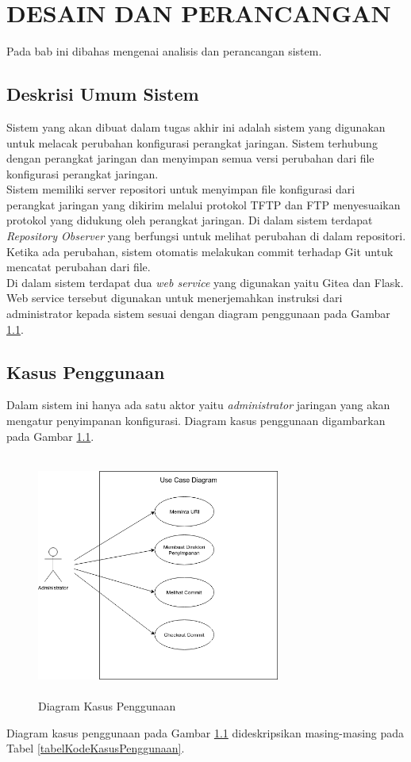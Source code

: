 \chapter{DESAIN DAN PERANCANGAN}
    Pada bab ini dibahas mengenai analisis dan perancangan sistem.
    
    \section{Deskrisi Umum Sistem}
    	Sistem yang akan dibuat dalam tugas akhir ini adalah sistem yang digunakan untuk melacak perubahan konfigurasi perangkat jaringan. Sistem terhubung dengan perangkat jaringan dan menyimpan semua versi perubahan dari file konfigurasi perangkat jaringan.\\
    	
    	\indent Sistem memiliki server repositori untuk menyimpan file konfigurasi dari perangkat jaringan yang dikirim melalui protokol TFTP dan FTP menyesuaikan protokol yang didukung oleh perangkat jaringan. Di dalam sistem terdapat \textit{Repository Observer} yang berfungsi untuk melihat perubahan di dalam repositori. Ketika ada perubahan, sistem otomatis melakukan commit terhadap Git untuk mencatat perubahan dari file.\\
    	
    	\indent Di dalam sistem terdapat dua \textit{web service} yang digunakan yaitu Gitea dan Flask. Web service tersebut digunakan untuk menerjemahkan instruksi dari administrator kepada sistem sesuai dengan diagram penggunaan pada Gambar \ref{usecase}. 
	
    \section{Kasus Penggunaan}
    	Dalam sistem ini hanya ada satu aktor yaitu \textit{administrator} jaringan yang akan mengatur penyimpanan konfigurasi. Diagram kasus penggunaan digambarkan pada Gambar \ref{usecase}.
        \begin{figure}[H]
			\centering
			\includegraphics[width=8cm,height=8cm]{Images/C-3/UC.png}
			\caption{Diagram Kasus Penggunaan}
			\label{usecase}
		\end{figure}
        \indent Diagram kasus penggunaan pada Gambar \ref{usecase} dideskripsikan masing-masing pada Tabel \ref {tabelKodeKasusPenggunaan}.
        
